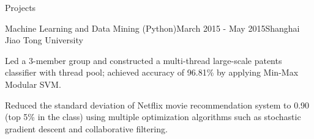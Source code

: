 \documentclass{resume} %
\begin{document}
\begin{rSection}{Projects}
\begin{rSubsection}{Machine Learning and Data Mining (Python)}{March 2015 - May 2015}{}{Shanghai Jiao Tong University}
\item Led a 3-member group and constructed a multi-thread large-scale patents classifier with thread pool; achieved accuracy of 96.81\% by applying Min-Max Modular SVM.
\item Reduced the standard deviation of Netflix movie recommendation system to 0.90 (top 5\% in the class) using multiple optimization algorithms such as stochastic gradient descent and collaborative filtering.
\end{rSubsection}



\end{rSection}



\end{document}
